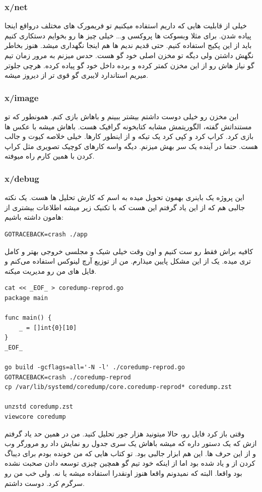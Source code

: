 \subsubsection{x/net}
خیلی از قابلیت هایی که داریم استفاده میکنیم تو فریمورک های مختلف درواقع اینجا پیاده شدن. برای مثلا وبسوکت ها پروکسی و...
خیلی چیز ها رو بخوایم دستکاری کنیم باید از این پکیج استفاده کنیم. حتی قدیم ندیم ها  هم اینجا نگهداری میشد. هنوز
بخاطر  نگهش داشتن ولی دیگه تو مخزن اصلی خود گو هست. حدس میزنم به مرور زمان تیم گو نیاز هاش
رو از این مخزن کمتر کرده و برده داخل خود گو پیاده کرده. هرچی جلوتر میریم استاندارد لایبری گو قوی تر از دیروز میشه.

\subsubsection{x/image}
این مخزن رو خیلی دوست داشتم بیشتر ببینم و باهاش بازی کنم. همونطور که تو مستنداتش
گفته، الگوریتمش مشابه کتابخونه گرافیک  هست. باهاش میشه با عکس ها بازی کرد. کراپ کرد و کپی کرد یک تیکه و از اینطور کارها.
خیلی خلاصه کیوت و جالب هست. حتما در آینده یک سر بهش میزنم. دیگه واسه کارهای کوچیک تصویری مثل کراپ کردن با همین کارم راه میوفته.

\subsubsection{x/debug}
این پروژه یک باینری بهمون تحویل میده به اسم  که کارش تحلیل  ها هست. یک نکته جالبی هم که
از این یاد گرفتم این هست که با تکنیک زیر میشه اطلاعات بیشتری از  هامون داشته باشیم:
\begin{latin}
\begin{verbatim}
GOTRACEBACK=crash ./app
\end{verbatim}
\end{latin}

کافیه براش فقط  رو ست کنیم و اون وقت خیلی شیک و مجلسی خروجی بهتر و کامل تری میده.
یک  از این مشکل پایین میذارم. من از توزیع آرچ لینوکس استفاده می‌کنم و فایل های  من رو 
مدیریت میکنه.
\begin{latin}
\begin{verbatim}
cat << _EOF_ > coredump-reprod.go
package main

func main() {
    _ = []int{0}[10]
}
_EOF_

go build -gcflags=all='-N -l' ./coredump-reprod.go
GOTRACEBACK=crash ./coredump-reprod
cp /var/lib/systemd/coredump/core.coredump-reprod* coredump.zst

unzstd coredump.zst
viewcore coredump
\end{verbatim}
\end{latin}
وقتی  باز کرد فایل رو، حالا میتونید هزار جور تحلیل کنید. من در همین حد یاد گرفتم ازش که یک دستور  داره که میشه باهاش
یک سری جدول رو نمایش داد رو مرورگر وب و از این حرف ها. این هم ابزار جالبی بود. تو کتاب هایی که من خونده بودم برای دیباگ کردن از 
و  یاد شده بود اما از اینکه خود تیم گو همچین چیزی توسعه دادن صحبت نشده بود واقعا. البته که نمیدونم واقعا هنوز اونقدرا استفاده میشه یا نه.
ولی خب من رو سرگرم کرد. دوست داشتم.

